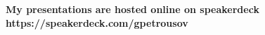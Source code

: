 


\begin{cventries}

\bfseries{My presentations are hosted online on speakerdeck https://speakerdeck.com/gpetrousov}



\end{cventries}